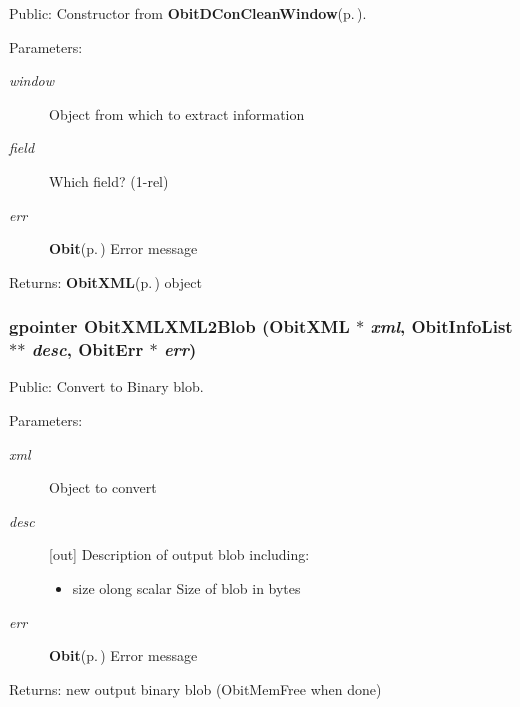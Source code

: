 Public: Constructor from {\bf Obit\-DCon\-Clean\-Window}{\rm (p.\,\pageref{structObitDConCleanWindow})}. 

\begin{Desc}
\item[Parameters:]
\begin{description}
\item[{\em window}]Object from which to extract information \item[{\em field}]Which field? (1-rel) \item[{\em err}]{\bf Obit}{\rm (p.\,\pageref{structObit})} Error message \end{description}
\end{Desc}
\begin{Desc}
\item[Returns:]{\bf Obit\-XML}{\rm (p.\,\pageref{structObitXML})} object \end{Desc}
\subsubsection{\setlength{\rightskip}{0pt plus 5cm}gpointer Obit\-XMLXML2Blob ({\bf Obit\-XML} $\ast$ {\em xml}, {\bf Obit\-Info\-List} $\ast$$\ast$ {\em desc}, {\bf Obit\-Err} $\ast$ {\em err})}\label{ObitXML_8c_a24}


Public: Convert to Binary blob. 

\begin{Desc}
\item[Parameters:]
\begin{description}
\item[{\em xml}]Object to convert \item[{\em desc}][out] Description of output blob including: \begin{itemize}
\item size olong scalar Size of blob in bytes \end{itemize}
\item[{\em err}]{\bf Obit}{\rm (p.\,\pageref{structObit})} Error message \end{description}
\end{Desc}
\begin{Desc}
\item[Returns:]new output binary blob (Obit\-Mem\-Free when done) \end{Desc}
